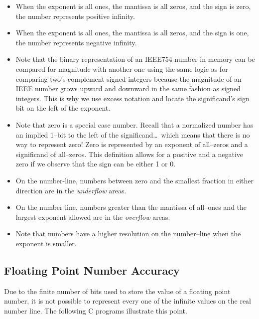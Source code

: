 \begin{itemize}
\item When the exponent is all ones, the mantissa is all zeros, and
the sign is zero, the number represents positive infinity.

\item When the exponent is all ones, the mantissa is all zeros, and
the sign is one, the number represents negative infinity.

\item Note that the binary representation of an IEEE754 number in memory
can be compared for magnitude with another one using the same logic as for
comparing two's complement signed integers because the magnitude of an 
IEEE number grows upward and downward in the same fashion as signed integers.
This is why we use excess notation and locate the significand's sign bit on
the left of the exponent.

\item Note that zero is a special case number.  Recall that a normalized
number has an implied 1--bit to the left of the significand\ldots\ which
means that there is no way to represent zero!
Zero is represented by an exponent of all--zeros and a significand of 
all--zeros.  This definition allows for a positive and a negative zero 
if we observe that the sign can be either 1 or 0.

\item On the number-line, numbers between zero and the smallest fraction in 
either direction are in the {\em \gls{underflow}} areas.

\item On the number line, numbers greater than the mantissa of all--ones and the 
largest exponent allowed are in the {\em \gls{overflow}} areas.

\item Note that numbers have a higher resolution on the number--line when the 
exponent is smaller.
\end{itemize}

\subsection{Floating Point Number Accuracy}
Due to the finite number of bits used to store the value of a floating point
number, it is not possible to represent every one of the infinite values
on the real number line.  The following C programs illustrate this point.

